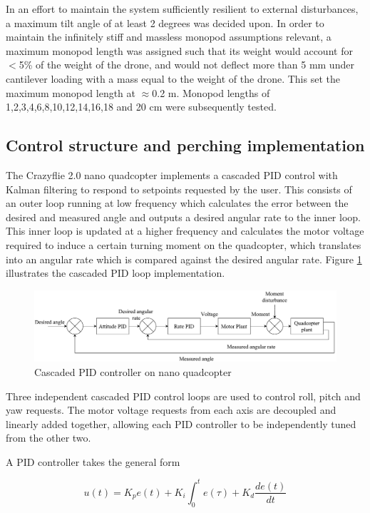 \documentclass[12pt,a4paper]{article}
\begin{document}
In an effort to maintain the system sufficiently resilient to external disturbances, a maximum tilt angle of at least 2 degrees was decided upon. In order to maintain the infinitely stiff and massless monopod assumptions relevant, a maximum monopod length was assigned such that its weight would account for $<$5\% of the weight of the drone, and would not deflect more than 5 mm under cantilever loading with a mass equal to the weight of the drone. This set the maximum monopod length at $\approx$0.2 m. Monopod lengths of 1,2,3,4,6,8,10,12,14,16,18 and 20 cm were subsequently tested.

\subsection{Control structure and perching implementation}
The Crazyflie 2.0 nano quadcopter implements a cascaded PID control with Kalman filtering to respond to setpoints requested by the user. This consists of an outer loop running at low frequency which calculates the error between the desired and measured angle and outputs a desired angular rate to the inner loop. This inner loop is updated at a higher frequency and calculates the motor voltage required to induce a certain turning moment on the quadcopter, which translates into an angular rate which is compared against the desired angular rate. Figure \ref{fig4} illustrates the cascaded PID loop implementation.


\begin{figure}[h!]
\centering
 \includegraphics[scale=0.4]{Quad_PID.pdf}
  \caption{Cascaded PID controller on nano quadcopter}
  \label{fig4}
\end{figure}

Three independent cascaded PID control loops are used to control roll, pitch and yaw requests. The motor voltage requests from each axis are decoupled and linearly added together, allowing each PID controller to be independently tuned from the other two.

A PID controller takes the general form \cite{PID}

\begin{equation}
 u(t) = K_pe(t) + K_i\int_0^te(\tau)+K_d\frac{de(t)}{dt}
\end{equation}
\end{document}
